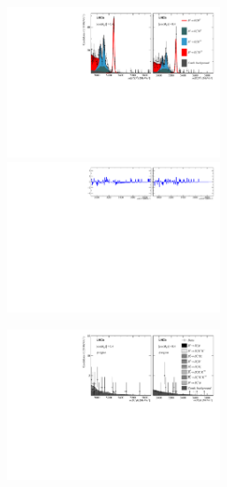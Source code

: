 \begin{figure}[!h]
    \centering
    \begin{subfigure}[t]{1.0\textwidth}
        \centering
        \includegraphics[width=0.7\textwidth]{figs/Appendix_FitCategories/canvas_DsD0_Ds2KPiPi_both_summed_splitHel_splitKKPi_s21_s21r1_s24_s26.pdf}\\
        \includegraphics[width=0.7\textwidth]{figs/Appendix_FitCategories/residuals_DsD0_Ds2KPiPi_both_summed_splitHel_splitKKPi_s21_s21r1_s24_s26.pdf}
    \end{subfigure}
    \begin{subfigure}[t]{1.0\textwidth}
        \centering
        \includegraphics[width=0.7\textwidth]{figs/Appendix_FitCategories/canvas_DsPhi_Ds2KPiPi_both_summed_splitHel_splitKKPi_s21_s21r1_s24_s26.pdf}\\

\end{subfigure}
\end{figure}
